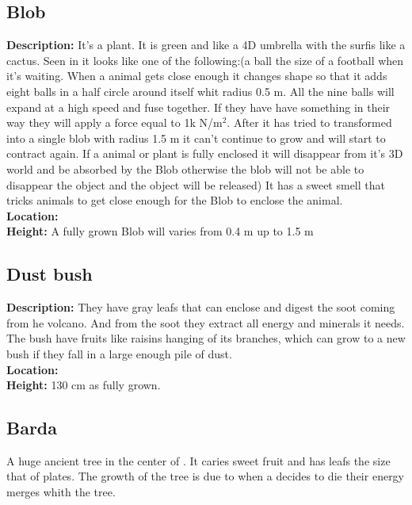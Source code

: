 \documentclass{article}
\begin{document}
\subsection{Blob}
\label{blob}

\textbf{Description: } It's a  plant. It is green and like a 4D umbrella with the surfis like a cactus. Seen in  it looks like one of the following:(a ball the size of a football when it's waiting. When a animal gets close enough it changes shape so that it adds eight balls in a half circle around itself whit radius 0.5 m. All the nine balls will expand at a high speed and fuse together. If they have have something in their way they will apply a force equal to 1k N/m$^2$. After it has tried to transformed into a single blob with radius 1.5 m it can't continue to grow and will start to contract again. If a animal or plant is fully enclosed it will disappear from it's 3D world and be absorbed by the Blob otherwise the blob will not be able to disappear the object and the object will be released)  It has a sweet smell that tricks animals to get close enough for the Blob to enclose the animal. 
\\\textbf{Location: }
\\\textbf{Height: }A fully grown Blob will varies from 0.4 m up to 1.5 m

\subsection{Dust bush}
\label{dust bush}
\textbf{Description: } They have gray leafs that can enclose and digest the soot coming from he volcano. And from the soot they extract all energy and minerals it needs. The bush have fruits like raisins hanging of its branches, which can grow to a new bush if they fall in a large enough pile of dust.
\\\textbf{Location: }
\\\textbf{Height: } 130 cm as fully grown.
\subsection{Barda}
\label{big tree}
A huge ancient tree in the center of . It caries sweet fruit and has leafs the size that of plates. The growth of the tree is due to when a  decides to die their energy merges whith the tree. 
\end{document}
